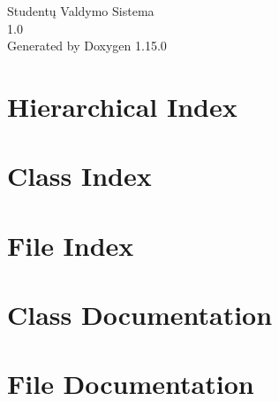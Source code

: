 \documentclass[twoside]{book}
\newcommand{\+}{\discretionary{\mbox{\scriptsize$\hookleftarrow$}}{}{}}
\newcommand{\clearemptydoublepage}{%
    \newpage{\pagestyle{empty}\cleardoublepage}%
  }
\begin{document}
  \raggedbottom
    \hypersetup{pageanchor=false,
                bookmarksnumbered=true,
                pdfencoding=unicode
               }
  \begin{titlepage}
  \vspace*{7cm}
  \begin{center}%
  {\Large Studentų Valdymo Sistema}\\
  [1ex]\large 1.\+0 \\
  \vspace*{1cm}
  {\large Generated by Doxygen 1.15.0}\\
  \end{center}
  \end{titlepage}
  \clearemptydoublepage
  \tableofcontents
  \clearemptydoublepage
  \hypersetup{pageanchor=true}
\chapter{Hierarchical Index}

\chapter{Class Index}

\chapter{File Index}

\chapter{Class Documentation}


\chapter{File Documentation}














  \backmatter
  \newpage
  \clearemptydoublepage
  \printindex
\end{document}
